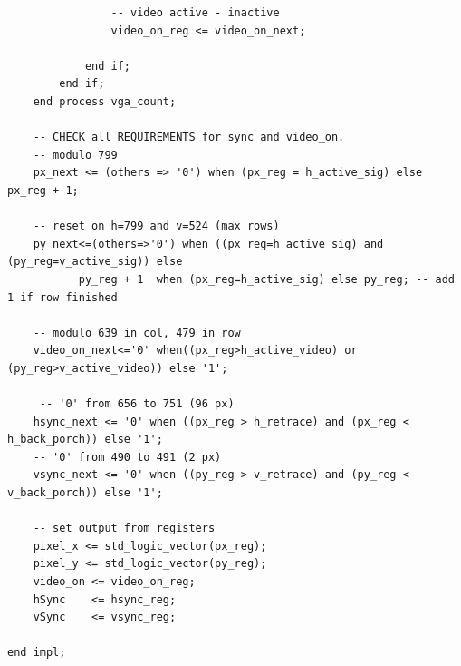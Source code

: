 \begin{verbatim}
                -- video active - inactive
                video_on_reg <= video_on_next;
      
            end if;
        end if;
    end process vga_count;
    
    -- CHECK all REQUIREMENTS for sync and video_on.
    -- modulo 799
    px_next <= (others => '0') when (px_reg = h_active_sig) else px_reg + 1; 
    
    -- reset on h=799 and v=524 (max rows)
    py_next<=(others=>'0') when ((px_reg=h_active_sig) and (py_reg=v_active_sig)) else 
           py_reg + 1  when (px_reg=h_active_sig) else py_reg; -- add 1 if row finished 
    
    -- modulo 639 in col, 479 in row
    video_on_next<='0' when((px_reg>h_active_video) or (py_reg>v_active_video)) else '1'; 
    
     -- '0' from 656 to 751 (96 px)
    hsync_next <= '0' when ((px_reg > h_retrace) and (px_reg < h_back_porch)) else '1';
    -- '0' from 490 to 491 (2 px)
    vsync_next <= '0' when ((py_reg > v_retrace) and (py_reg < v_back_porch)) else '1';  
    
    -- set output from registers
    pixel_x <= std_logic_vector(px_reg);
    pixel_y <= std_logic_vector(py_reg);
    video_on <= video_on_reg;
    hSync    <= hsync_reg;
    vSync    <= vsync_reg;

end impl;
 \end{verbatim}